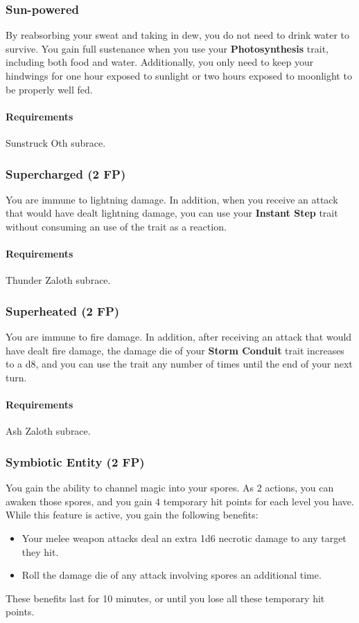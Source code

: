 \subsubsection{Sun-powered} \label{feat::sunpowered}
    By reabsorbing your sweat and taking in dew, you do not need to drink water to survive.
    You gain full sustenance when you use your \textbf{Photosynthesis} trait, including both food and water.
    Additionally, you only need to keep your hindwings for one hour exposed to sunlight or two hours exposed to moonlight to be properly well fed.
    \paragraph{Requirements} Sunstruck Oth subrace.
\subsubsection{Supercharged (2 FP)} \label{feat::supercharged}
    You are immune to lightning damage.
    In addition, when you receive an attack that would have dealt lightning damage, you can use your \textbf{Instant Step} trait without consuming an use of the trait as a reaction.
    \paragraph{Requirements} Thunder Zaloth subrace.
\subsubsection{Superheated (2 FP)} \label{feat::superheated}
    You are immune to fire damage.
    In addition, after receiving an attack that would have dealt fire damage, the damage die of your \textbf{Storm Conduit} trait increases to a d8, and you can use the trait any number of times until the end of your next turn.
    \paragraph{Requirements} Ash Zaloth subrace.
\subsubsection{Symbiotic Entity (2 FP)} \label{feat::symbioticentity}
    You gain the ability to channel magic into your spores.
    As 2 actions, you can awaken those spores, and you gain 4 temporary hit points for each level you have.
    While this feature is active, you gain the following benefits:
    \begin{itemize}
        \item Your melee weapon attacks deal an extra 1d6 necrotic damage to any target they hit.
        \item Roll the damage die of any attack involving spores an additional time.
    \end{itemize}
    These benefits last for 10 minutes, or until you lose all these temporary hit points.
